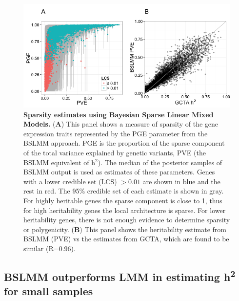 \documentclass[10pt,letterpaper]{article}
\begin{document}
\begin{figure}[H]
\includegraphics[width=12cm]{Figures/Fig-DGN-BSLMM.png}
\caption{{\bf Sparsity estimates using Bayesian Sparse Linear Mixed Models.} 
(\textbf{A}) This panel shows a measure of sparsity of the gene expression traits represented by the PGE parameter from the BSLMM approach. PGE is the proportion of the sparse component of the total variance explained by genetic variants, PVE (the BSLMM equivalent of h$^2$). The median of the posterior samples of BSLMM output is used as estimates of these parameters.
Genes with a lower credible set (LCS) $>0.01$ are shown in blue and the rest in red. The 95\% credible set of each estimate is shown in gray. 
 For highly heritable genes the sparse component is close to 1, thus for high heritability genes the local architecture is sparse. For lower heritability genes, there is not enough evidence to determine sparsity or polygenicity. (\textbf{B}) This panel shows the heritability estimate from BSLMM (PVE) vs the estimates from GCTA, which are found to be similar (R=0.96). 
%
}
\label{fig-dgn-bslmm}
\end{figure}

\subsection*{BSLMM outperforms LMM in estimating h\textsuperscript{2}  for small samples}
\end{document}
